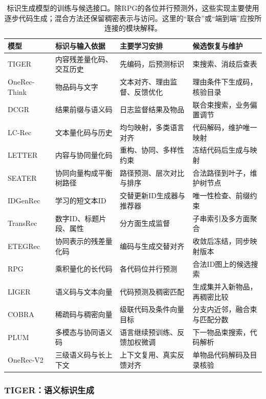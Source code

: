 \begin{table}[htbp]
 \centering\small
 \renewcommand{\arraystretch}{1.12}
 \begin{tabularx}{\linewidth}{@{}lXXX@{}}
 \toprule
 模型 & 标识与输入依据 & 主要学习安排 & 候选恢复与维护 \\
 \midrule
 TIGER & 内容残差量化码、交互历史 & 先编码，后预测标识 & 束搜索、消歧后查表 \\
 OneRec-Think & 物品码与文字 & 文本对齐、理由监督、反馈优化 & 理由条件下生成码，核验目录 \\
 DCGR & 结果前缀与语义码 & 日志监督结果及物品 & 联合束搜索，业务偏置调节 \\
 LC-Rec & 文本量化码与历史 & 均匀映射，多类语言对齐 & 代码解码，维护唯一映射 \\
 LETTER & 内容与协同量化码 & 重构、协同、多样性约束 & 冻结代码后生成与映射 \\
 SEATER & 协同向量构成平衡树路径 & 路径预测、层次对比与排序 & 合法路径到叶子，维护树节点 \\
 IDGenRec & 学习的短文本ID & 交替更新ID生成器与推荐器 & 唯一性检查、前缀约束 \\
 TransRec & 数字ID、标题片段、属性 & 分方面生成监督 & 子串索引及多方面聚合 \\
 ETEGRec & 协同表示的残差量化码 & 编码与生成交替对齐 & 收敛后冻结，同步映射版本 \\
 RPG & 乘积量化的长代码 & 各代码位并行预测 & 合法ID图上的候选搜索 \\
 LIGER & 语义码与文本向量 & 代码预测及稠密匹配 & 生成集并入新物品，再稠密比较 \\
 COBRA & 稀疏码与稠密向量 & 级联代码及条件向量目标 & 分支内近邻，融合束与匹配分数 \\
 PLUM & 多模态与协同语义码 & 语言继续预训练、反馈加权微调 & 下一物品束搜索，代码解析 \\
 OneRec-V2 & 三级语义码与长上下文 & 上下文复用、真实反馈对齐 & 单物品代码解码及目录核验 \\
 \bottomrule
 \end{tabularx}
 \caption{标识生成模型的训练与候选接口。除RPG的各位并行预测外，这些实现主要使用逐步代码生成；混合方法还保留稠密表示与访问。这里的“联合”或“端到端”应按所连接的模块解释。}
 \label{tab:rs-id-models}
\end{table}

\subsubsection{TIGER：语义标识生成}
\label{sec:rs-tiger}

